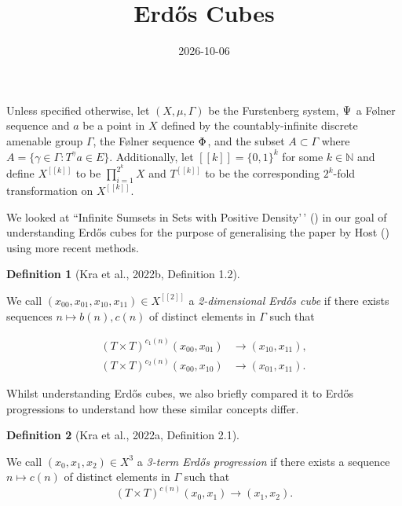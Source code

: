 \documentclass[
  british,
]{article}
\title{Erdős Cubes}
\author{}
\date{2026-10-06}
\theoremstyle{plain}
\theoremstyle{definition}
\newtheorem{definition}{Definition}[section]
\theoremstyle{remark}
\newcommand{\Folner}[1][\vphantom{}]{{\Phi}_{#1}}
\newcommand{\FurstenbergFolner}[1][{\vphantom{}}]{{\Psi}_{#1}}
\newcommand{\Group}{{\Gamma}}
\newcommand{\GroupElement}{{\gamma}}
\newcommand{\Measure}{{\mu}}
\newcommand{\ShiftSpace}{{X}}
\begin{document}
\maketitle


Unless specified otherwise, let \((\ShiftSpace,\Measure,\Group)\) be the
Furstenberg system, \(\FurstenbergFolner\) a Følner sequence and \(a\)
be a point in \(\ShiftSpace\) defined by the countably-infinite discrete
amenable group \(\Group\), the Følner sequence \(\Folner\), and the
subset \(A\subset\Group\) where
\(A=\{\GroupElement\in\Group:T^{\GroupElement}a\in E\}\). Additionally,
let \([[k]]=\{0,1\}^k\) for some \(k\in\mathbb{N}\) and define
\(\ShiftSpace^{[[k]]}\) to be \(\prod_{i=1}^{2^k}\ShiftSpace\) and
\(T^{[[k]]}\) to be the corresponding \(2^k\)-fold transformation on
\(\ShiftSpace^{[[k]]}\).

We looked at ``Infinite Sumsets in Sets with Positive Density'\,'
() in our goal of
understanding Erdős cubes for the purpose of generalising the paper by
Host () using more recent methods.

\begin{definition}[{Kra et al., 2022b, Definition
1.2}]\protect\hypertarget{def-2DErdosCube}{}\label{def-2DErdosCube}

We call \((x_{00},x_{01},x_{10},x_{11})\in\ShiftSpace^{[[2]]}\) a
\emph{2-dimensional Erdős cube} if there exists sequences
\(n\mapsto b(n),c(n)\) of distinct elements in \(\Group\) such that

\begin{align*}
(T\times T)^{c_1(n)}(x_{00},x_{01})&\rightarrow(x_{10},x_{11}),
\\(T\times T)^{c_2(n)}(x_{00},x_{10})&\rightarrow(x_{01},x_{11}).
\end{align*}

\end{definition}

Whilst understanding Erdős cubes, we also briefly compared it to Erdős
progressions to understand how these similar concepts differ.

\begin{definition}[{Kra et al., 2022a, Definition
2.1}]\protect\hypertarget{def-3ErdosProgression}{}\label{def-3ErdosProgression}

We call \((x_0,x_1,x_2)\in\ShiftSpace^3\) a \emph{3-term Erdős
progression} if there exists a sequence \(n\mapsto c(n)\) of distinct
elements in \(\Group\) such that
\[(T\times T)^{c(n)}(x_0,x_1)\rightarrow(x_1,x_2).\]

\end{definition}
\end{document}
